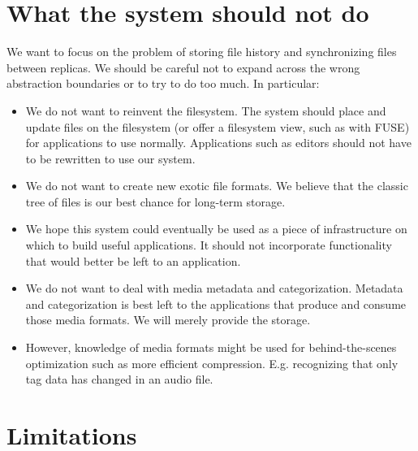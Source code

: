 \section{What the system should not do}

We want to focus on the problem of storing file history and synchronizing files
between replicas.
We should be careful not to expand across the wrong abstraction boundaries or to
try to do too much.
In particular:

\begin{itemize}

  \item We do not want to reinvent the filesystem. The system should place and
    update files on the filesystem (or offer a filesystem view, such as with
    FUSE) for applications to use normally. Applications such as editors should
    not have to be rewritten to use our system.

  \item We do not want to create new exotic file formats. We believe that the
    classic tree of files is our best chance for long-term storage.

  \item We hope this system could eventually be used as a piece of
    infrastructure on which to build useful applications. It should not
    incorporate functionality that would better be left to an application.

  \item We do not want to deal with media metadata and categorization. Metadata
    and categorization is best left to the applications that produce and consume
    those media formats. We will merely provide the storage.

  \item However, knowledge of media formats might be used for behind-the-scenes
    optimization such as more efficient compression. E.g. recognizing that only
    tag data has changed in an audio file.

\end{itemize}



\section{Limitations}

